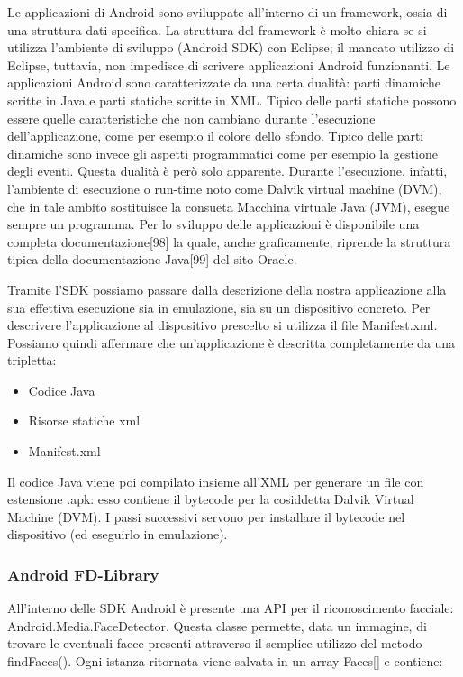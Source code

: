 Le applicazioni di Android sono sviluppate all'interno di un framework, ossia di una struttura dati specifica. La struttura del framework è molto chiara se si utilizza l'ambiente di sviluppo (Android SDK) con Eclipse; il mancato utilizzo di Eclipse, tuttavia, non impedisce di scrivere applicazioni Android funzionanti.
Le applicazioni Android sono caratterizzate da una certa dualità: parti dinamiche scritte in Java e parti statiche scritte in XML. Tipico delle parti statiche possono essere quelle caratteristiche che non cambiano durante l'esecuzione dell'applicazione, come per esempio il colore dello sfondo. Tipico delle parti dinamiche sono invece gli aspetti programmatici come per esempio la gestione degli eventi.
Questa dualità è però solo apparente. Durante l'esecuzione, infatti, l'ambiente di esecuzione o run-time noto come Dalvik virtual machine (DVM), che in tale ambito sostituisce la consueta Macchina virtuale Java (JVM), esegue sempre un programma. Per lo sviluppo delle applicazioni è disponibile una completa documentazione[98] la quale, anche graficamente, riprende la struttura tipica della documentazione Java[99] del sito Oracle.

Tramite l'SDK possiamo passare dalla descrizione della nostra applicazione alla sua effettiva esecuzione sia in emulazione, sia su un dispositivo concreto. Per descrivere l'applicazione al dispositivo prescelto si utilizza il file Manifest.xml. Possiamo quindi affermare che un'applicazione è descritta completamente da una tripletta:

\begin{itemize}
\item Codice Java
\item Risorse statiche xml
\item Manifest.xml
\end{itemize}

Il codice Java viene poi compilato insieme all'XML per generare un file con estensione .apk: esso contiene il bytecode per la cosiddetta Dalvik Virtual Machine (DVM). I passi successivi servono per installare il bytecode nel dispositivo (ed eseguirlo in emulazione).



\subsubsection{Android FD-Library}

All'interno delle SDK Android è presente una API per il riconoscimento facciale: Android.Media.FaceDetector. Questa classe permette, data un immagine, di trovare le eventuali facce presenti attraverso il semplice utilizzo del metodo findFaces(). Ogni istanza ritornata viene salvata in un array Faces[] e contiene:

